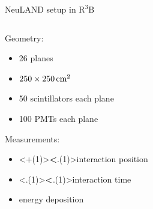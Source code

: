 \documentclass[compress, 13pt, aspectratio=169]{beamer}
\begin{document}
{\begin{frame}{NeuLAND setup in $\text{R}^3\text{B}$}
\begin{columns}[c]
\begin{column}{0.3\textwidth}
\begin{exampleblock}{}
				Geometry:\\
				\begin{itemize}
					\item 26 planes
					\item $\qtyproduct[product-units=power]{250 x 250}{\centi\meter}$
					\item 50 scintillators each plane
					\item 100 PMTs each plane
				\end{itemize}
				\pause
				Measurements:\\
				\begin{itemize}
					\item \alert<+(1)>{\textbf<.(1)>{interaction position}}
					\item \alert<.(1)>{\textbf<.(1)>{interaction time}}
					\item energy deposition
				\end{itemize}
			\end{exampleblock}
		\end{column}
		\begin{column}{0.3\textwidth}
		\end{column}
	\end{columns}
	\let\thefootnote\relax{}
\end{frame}
}
\end{document}
